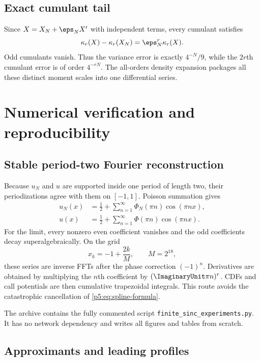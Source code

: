 \documentclass[11pt,oneside]{article}
\numberwithin{equation}{section}
\theoremstyle{definition}
\theoremstyle{remark}
\begin{document}
\subsection{Exact cumulant tail}

Since $X=X_N+\eps_NX'$ with independent terms, every cumulant satisfies
\begin{equation}
 \kappa_r(X)-\kappa_r(X_N)=\eps_N^r\kappa_r(X).
 \label{p5:eq:cumulant-tail}
\end{equation}
Odd cumulants vanish.  Thus the variance error is exactly $4^{-N}/9$, while the $2r$th cumulant error is of order $4^{-rN}$.  The all-orders density expansion packages all these distinct moment scales into one differential series.

\section{Numerical verification and reproducibility}
\label{p5:sec:numerics}

\subsection{Stable period-two Fourier reconstruction}

Because $u_N$ and $u$ are supported inside one period of length two, their periodizations agree with them on $[-1,1]$.  Poisson summation gives
\begin{align}
 u_N(x)&=\frac12+\sum_{n=1}^{\infty}\Phi_N(\pi n)\cos(\pi nx),
 \label{p5:eq:cosine-N}\\
 u(x)&=\frac12+\sum_{n=1}^{\infty}\Phi(\pi n)\cos(\pi nx).
 \label{p5:eq:cosine-limit}
\end{align}
For the limit, every nonzero even coefficient vanishes and the odd coefficients decay superalgebraically.  On the grid
\[
 x_k=-1+\frac{2k}{M},\qquad M=2^{18},
\]
these series are inverse FFTs after the phase correction $(-1)^n$.  Derivatives are obtained by multiplying the $n$th coefficient by $(\ImaginaryUnit\pi n)^r$.  CDFs and call potentials are then cumulative trapezoidal integrals.  This route avoids the catastrophic cancellation of \eqref{p5:eq:spline-formula}.

The archive contains the fully commented script \texttt{finite\_sinc\_experiments.py}.  It has no network dependency and writes all figures and tables from scratch.

\subsection{Approximants and leading profiles}
\end{document}

